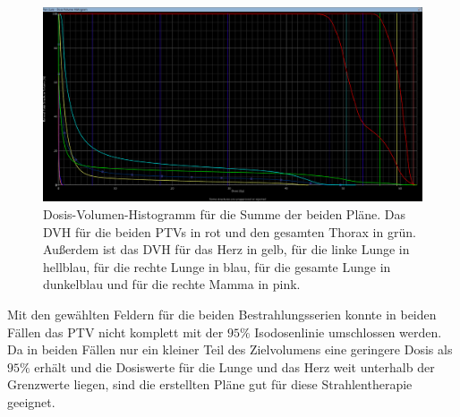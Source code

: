 \begin{figure}[H]
  \centering
  \includegraphics[width=\textwidth]{Bilder/DVHsumme.png}
  \caption{Dosis-Volumen-Histogramm für die Summe der beiden Pläne. Das DVH für die beiden PTVs in rot und den gesamten Thorax in grün. Außerdem ist das DVH für das Herz in gelb, für die linke Lunge in hellblau, für die rechte Lunge in blau, für die gesamte Lunge in dunkelblau und für die rechte Mamma in pink.}
  \label{abb:DVHsum}
\end{figure}

Mit den gewählten Feldern für die beiden Bestrahlungsserien konnte in beiden Fällen
das PTV nicht komplett mit der $95\%$ Isodosenlinie umschlossen werden. Da in beiden
Fällen nur ein kleiner Teil des Zielvolumens eine geringere Dosis als $95\%$ erhält und
die Dosiswerte für die Lunge und das Herz weit unterhalb der Grenzwerte liegen, sind die
erstellten Pläne gut für diese Strahlentherapie geeignet.
